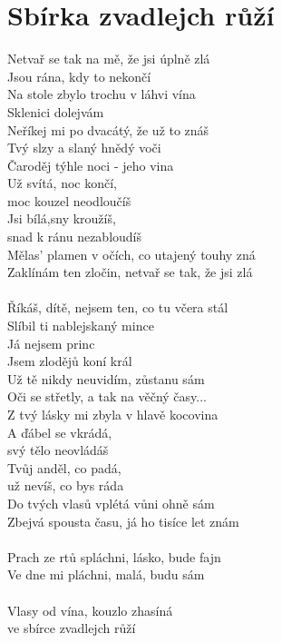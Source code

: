 \section{Sbírka zvadlejch růží}
\begin{multicols}{2}
Netvař se tak na mě, že jsi úplně zlá\\
Jsou rána, kdy to nekončí\\
Na stole zbylo trochu v láhvi vína\\
Sklenici dolejvám\\
Neříkej mi po dvacátý, že už to znáš\\
Tvý slzy a slaný hnědý voči\\
Čaroděj týhle noci - jeho vina\\
Už svítá, noc končí,\\
moc kouzel neodloučíš\\
Jsi bílá,sny kroužíš,\\
snad k ránu nezabloudíš\\
Mělas' plamen v očích, co utajený touhy zná\\
Zaklínám ten zločin, netvař se tak, že jsi zlá\\
\\
Říkáš, dítě, nejsem ten, co tu včera stál\\
Slíbil ti nablejskaný mince\\
Já nejsem princ\\
Jsem zlodějů koní král\\
Už tě nikdy neuvidím, zůstanu sám\\
Oči se střetly, a tak na věčný časy...\\
Z tvý lásky mi zbyla v hlavě kocovina\\
A ďábel se vkrádá,\\
svý tělo neovládáš\\
Tvůj anděl, co padá,\\
už nevíš, co bys ráda\\
Do tvých vlasů vplétá vůni ohně sám\\
Zbejvá spousta času, já ho tisíce let znám\\
\\
Prach ze rtů spláchni, lásko, bude fajn\\
Ve dne mi pláchni, malá, budu sám\\
\\
Vlasy od vína, kouzlo zhasíná\\
ve sbírce zvadlejch růží\\

\end{multicols}
